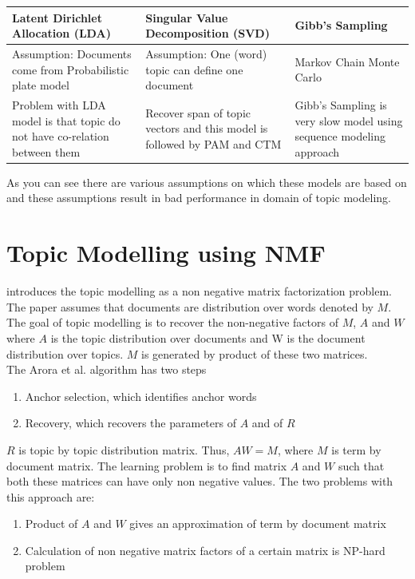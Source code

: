 \documentclass[a4paper,11pt]{article}
\begin{document}
\begin{center}
    \begin{tabular}{ | p{6cm} | p{5.5cm} | p{4cm}  |}
    \hline
    Latent Dirichlet Allocation (LDA) & Singular Value Decomposition (SVD) & Gibb's Sampling  \\ \hline
   Assumption:  Documents come from Probabilistic plate model & Assumption: One (word) topic can define one document & Markov Chain Monte Carlo  \\ \hline
    Problem with LDA model is that topic do not have co-relation between them & Recover span of topic vectors and this model is followed by PAM and CTM & Gibb's Sampling is very slow model using sequence modeling approach \\ \hline
    \end{tabular}
\end{center}

As you can see there are various assumptions on which these models are based on and these assumptions result in bad performance in domain of topic modeling.


\section{Topic Modelling using NMF}
\cite{tm} introduces the topic modelling as a non negative matrix factorization problem. The paper assumes that documents are distribution over words denoted by $M$. The goal of topic modelling is to recover the non-negative factors of $M$, $A$ and $W$ where $A$ is the topic distribution over documents and W is the document distribution over topics. $M$ is generated by product of these two matrices.\\

The Arora et al. \cite{tm} algorithm has two steps

\begin{enumerate}
\item Anchor selection, which identifies anchor words
\item Recovery, which recovers the parameters of $A$ and of $R$
\end{enumerate}  

$R$ is topic by topic distribution matrix. Thus, $AW = M$, where $M$ is term by document matrix. The learning problem is to find matrix $A$ and $W$ such that both these matrices can have only non negative values. The two problems with this approach are: \\

\begin{enumerate}
\item Product of $A$ and $W$ gives an approximation of term by document matrix  
\item Calculation of non negative matrix factors of a certain matrix is NP-hard problem
\end{enumerate}
\end{document}
